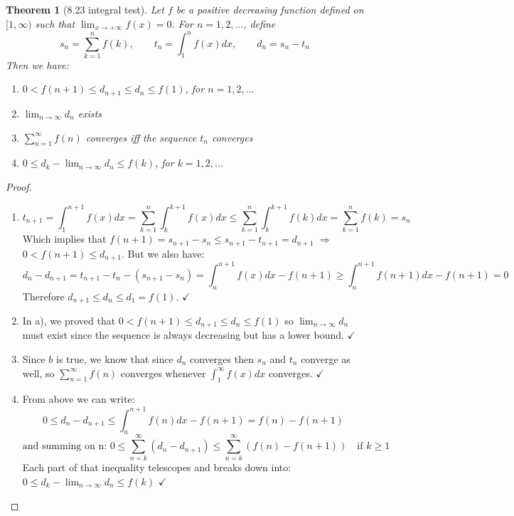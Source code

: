 \documentclass[aps,pra,notitlepage,amsmath,amssymb,letterpaper,12pt]{revtex4-1}
\newtheorem{theorem}{Theorem}
\begin{document}
\begin{theorem}[8.23 integral test]
Let $f$ be a positive decreasing function defined on $[1, \infty)$ such that $\lim_{x \to +\infty}f(x) = 0$. For $n = 1,2,...$, define
\[s_{n} = \sum_{k=1}^{n}f(k), \qquad  t_{n} = \int_{1}^{n}f(x)dx,  \qquad  d_{n}=s_{n}-t_{n}\]
Then we have:
\begin{enumerate}[\upshape a)]
  \item $0 < f(n+1) \leq d_{n+1} \leq d_{n} \leq f(1)$, \qquad for  $n=1,2,...$
  \item $\lim_{n \to \infty}d_{n}$ exists
  \item $\sum_{n=1}^{\infty}f(n)$ converges iff the sequence ${t_{n}}$ converges
  \item $0 \leq d_{k}-\lim_{n \to \infty}d_{n} \leq f(k)$, \qquad for $k=1,2,...$
\end{enumerate}
\end{theorem}
\begin{proof}
\newline{}
\begin{enumerate}[\upshape a)]
    \item $$t_{n+1} = \int_{1}^{n+1}f(x)dx = \sum_{k=1}^{n}\int_{k}^{k+1}f(x)dx \leq \sum_{k=1}^{n}\int_{k}^{k+1}f(k)dx = \sum_{k=1}^{n}f(k) = s_n$$
Which implies that $f(n+1) = s_{n+1}-s_n \leq s_{n+1}-t_{n+1} = d_{n+1}$ $\Rightarrow$ $0<f(n+1)\leq d_{n+1}$.
But we also have: $$d_n-d_{n+1} = t_{n+1} - t_n - (s_{n+1}-s_n) = \int_{n}^{n+1}f(x)dx - f(n+1) \geq \int_{n}^{n+1}f(n+1)dx - f(n+1)=0$$
Therefore $d_{n+1}\leq d_n \leq d_1 = f(1)$.  $\checkmark$
    \item In a), we proved that $0<f(n+1)\leq d_{n+1}\leq d_n\leq f(1)$ so $\lim_{n\to \infty}d_n$ must exist since the sequence is always decreasing but has a lower bound. $\checkmark$
    \item Since $b$ is true, we know that since $d_n$ converges then $s_n$ and $t_n$ converge as well, so $\sum_{n=1}^{\infty}f(n)$ converges whenever $\int_{1}^{\infty}f(x)dx$ converges. $\checkmark$
    \item From above we can write:
$$0\leq d_n-d_{n+1}\leq \int_{n}^{n+1}f(n)dx-f(n+1)=f(n)-f(n+1)$$
$$\textrm{and summing on n: } 0\leq \sum_{n=k}^{\infty}(d_n-d_{n+1})\leq \sum_{n=k}^{\infty}(f(n)-f(n+1)) \quad \textrm{if } k\geq 1$$
Each part of that inequality telescopes and breaks down into: $0\leq d_k-\lim_{n\to \infty}d_n\leq f(k)$ $\checkmark$
\end{enumerate}
\end{proof}
\end{document}
